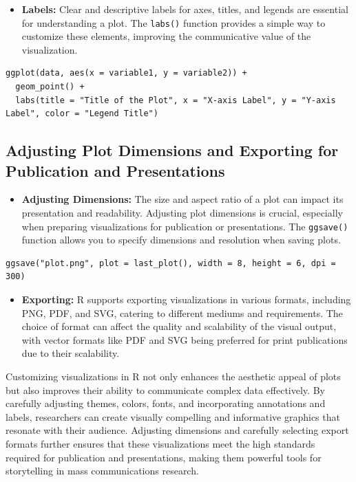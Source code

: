 \documentclass[
]{book}
\providecommand{\tightlist}{%
  \setlength{\itemsep}{0pt}\setlength{\parskip}{0pt}}
\begin{document}
\begin{itemize}
\tightlist
\item
  \textbf{Labels:} Clear and descriptive labels for axes, titles, and legends are essential for understanding a plot. The \texttt{labs()} function provides a simple way to customize these elements, improving the communicative value of the visualization.
\end{itemize}

\begin{verbatim}
ggplot(data, aes(x = variable1, y = variable2)) + 
  geom_point() +
  labs(title = "Title of the Plot", x = "X-axis Label", y = "Y-axis Label", color = "Legend Title")
\end{verbatim}

\hypertarget{adjusting-plot-dimensions-and-exporting-for-publication-and-presentations}{%
\subsection{Adjusting Plot Dimensions and Exporting for Publication and Presentations}\label{adjusting-plot-dimensions-and-exporting-for-publication-and-presentations}}

\begin{itemize}
\tightlist
\item
  \textbf{Adjusting Dimensions:} The size and aspect ratio of a plot can impact its presentation and readability. Adjusting plot dimensions is crucial, especially when preparing visualizations for publication or presentations. The \texttt{ggsave()} function allows you to specify dimensions and resolution when saving plots.
\end{itemize}

\begin{verbatim}
ggsave("plot.png", plot = last_plot(), width = 8, height = 6, dpi = 300)
\end{verbatim}

\begin{itemize}
\tightlist
\item
  \textbf{Exporting:} R supports exporting visualizations in various formats, including PNG, PDF, and SVG, catering to different mediums and requirements. The choice of format can affect the quality and scalability of the visual output, with vector formats like PDF and SVG being preferred for print publications due to their scalability.
\end{itemize}

Customizing visualizations in R not only enhances the aesthetic appeal of plots but also improves their ability to communicate complex data effectively. By carefully adjusting themes, colors, fonts, and incorporating annotations and labels, researchers can create visually compelling and informative graphics that resonate with their audience. Adjusting dimensions and carefully selecting export formats further ensures that these visualizations meet the high standards required for publication and presentations, making them powerful tools for storytelling in mass communications research.
\end{document}
